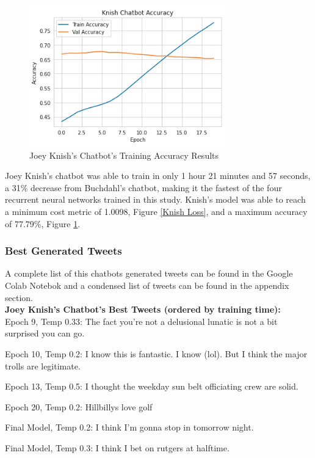 \documentclass[5p,authoryear]{elsarticle}
\begin{document}
\begin{figure}[!htb] \centering
	\includegraphics[width=3.4in]{figures/Knish_Acc.png}
	\caption[]{Joey Knish’s Chatbot’s Training Accuracy Results} 
	\label{Knish Acc} 
\end{figure}


Joey Knish’s chatbot was able to train in only 1 hour 21 minutes and 57 seconds, a 31\% decrease from Buchdahl’s chatbot, making it the fastest of the four recurrent neural networks trained in this study. Knish’s model was able to reach a minimum cost metric of 1.0098, Figure \ref{Knish Loss}, and a maximum accuracy of 77.79\%, Figure \ref{Knish Acc}.

\subsubsection{Best Generated Tweets}

A complete list of this chatbots generated tweets can be found in the Google Colab Notebok and a condensed list of tweets can be found in the appendix section.\\


\textbf{Joey Knish’s Chatbot’s Best Tweets (ordered by training time):}\\

Epoch 9, Temp 0.33:
The fact you’re not a delusional lunatic is not a bit surprised you can go.

Epoch 10, Temp 0.2:
I know this is fantastic. I know (lol). But I think the major trolls are legitimate. 

Epoch 13, Temp 0.5:
I thought the weekday sun belt officiating crew are solid.

Epoch 20, Temp 0.2:
Hillbillys love golf

Final Model, Temp 0.2:
I think I’m gonna stop in tomorrow night.

Final Model, Temp 0.3:
I think I bet on rutgers at halftime.
\end{document}
